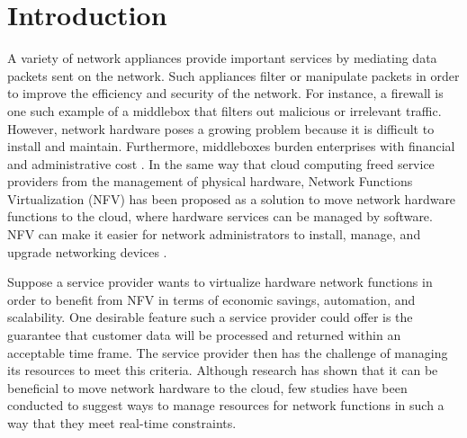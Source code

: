 \documentclass{sig-alternate}
\begin{document}
\section{Introduction}
\label{sec:intro}
A variety of network appliances provide important services by mediating data packets sent on the network. Such appliances filter or manipulate packets in order to improve the efficiency and security of the network. For instance, a firewall is one such example of a middlebox that filters out malicious or irrelevant traffic. However, network hardware poses a growing problem because it is difficult to install and maintain. Furthermore, middleboxes burden enterprises with financial and administrative cost \cite{white_paper}. In the same way that cloud computing freed service providers from the management of physical hardware, Network Functions Virtualization (NFV) has been proposed as a solution to move network hardware functions to the cloud, where hardware services can be managed by software. NFV can make it easier for network administrators to install, manage, and upgrade networking devices \cite{white_paper}.

Suppose a service provider wants to virtualize hardware network functions in order to benefit from NFV in terms of economic savings, automation, and scalability. One desirable feature such a service provider could offer is the guarantee that customer data will be processed and returned within an acceptable time frame. The service provider then has the challenge of managing its resources to meet this criteria. Although research has shown that it can be beneficial to move network hardware to the cloud, few studies have been conducted to suggest ways to manage resources for network functions in such a way that they meet real-time constraints.
\end{document}
